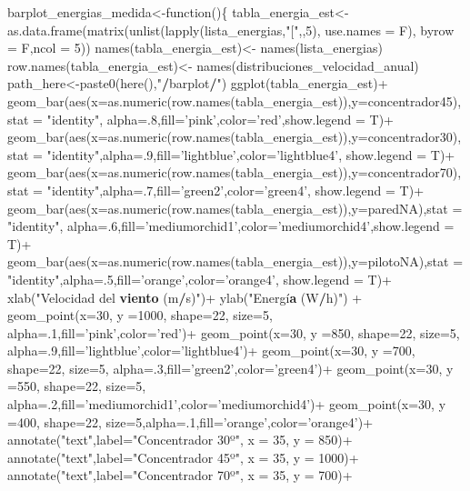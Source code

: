 \documentclass[]{article}
\newenvironment{Shaded}{\begin{snugshade}}{\end{snugshade}}
\newcommand{\KeywordTok}[1]{\textcolor[rgb]{0.13,0.29,0.53}{\textbf{#1}}}
\newcommand{\DecValTok}[1]{\textcolor[rgb]{0.00,0.00,0.81}{#1}}
\newcommand{\StringTok}[1]{\textcolor[rgb]{0.31,0.60,0.02}{#1}}
\newcommand{\OperatorTok}[1]{\textcolor[rgb]{0.81,0.36,0.00}{\textbf{#1}}}
\newcommand{\NormalTok}[1]{#1}
\begin{document}
\begin{Shaded}
\begin{Highlighting}[]
{{{{{{\StringTok{barplot_energias_medida<-function()\{}
\StringTok{  tabla_energia_est<-as.data.frame(matrix(unlist(lapply(lista_energias,"}\NormalTok{[}\StringTok{",,5), use.names = F), byrow = F,ncol = 5))}
\StringTok{  names(tabla_energia_est)<- names(lista_energias)}
\StringTok{  row.names(tabla_energia_est)<- names(distribuciones_velocidad_anual)}
\StringTok{  }
\StringTok{  path_here<-paste0(here(),"}\OperatorTok{/}\NormalTok{barplot}\OperatorTok{/}\StringTok{")}
\StringTok{  }
\StringTok{  }
\StringTok{  }
\StringTok{  }
\StringTok{  ggplot(tabla_energia_est)+}
\StringTok{    geom_bar(aes(x=as.numeric(row.names(tabla_energia_est)),y=concentrador45),stat = "}\NormalTok{identity}\StringTok{", alpha=.8,fill='pink',color='red',show.legend = T)+}
\StringTok{    geom_bar(aes(x=as.numeric(row.names(tabla_energia_est)),y=concentrador30),stat = "}\NormalTok{identity}\StringTok{",alpha=.9,fill='lightblue',color='lightblue4', show.legend = T)+}
\StringTok{    geom_bar(aes(x=as.numeric(row.names(tabla_energia_est)),y=concentrador70),stat = "}\NormalTok{identity}\StringTok{",alpha=.7,fill='green2',color='green4', show.legend = T)+}
\StringTok{    geom_bar(aes(x=as.numeric(row.names(tabla_energia_est)),y=paredNA),stat = "}\NormalTok{identity}\StringTok{", alpha=.6,fill='mediumorchid1',color='mediumorchid4',show.legend = T)+}
\StringTok{    geom_bar(aes(x=as.numeric(row.names(tabla_energia_est)),y=pilotoNA),stat = "}\NormalTok{identity}\StringTok{",alpha=.5,fill='orange',color='orange4', show.legend = T)+}
\StringTok{    xlab("}\NormalTok{Velocidad del }\KeywordTok{viento}\NormalTok{ (m}\OperatorTok{/}\NormalTok{s)}\StringTok{")+}
\StringTok{    ylab("}\NormalTok{Energí}\KeywordTok{a}\NormalTok{ (W}\OperatorTok{/}\NormalTok{h)}\StringTok{") +    }
\StringTok{    geom_point(x=30, y =1000, shape=22, size=5, alpha=.1,fill='pink',color='red')+}
\StringTok{    geom_point(x=30, y =850, shape=22, size=5, alpha=.9,fill='lightblue',color='lightblue4')+}
\StringTok{    geom_point(x=30, y =700, shape=22, size=5, alpha=.3,fill='green2',color='green4')+}
\StringTok{    geom_point(x=30, y =550, shape=22, size=5, alpha=.2,fill='mediumorchid1',color='mediumorchid4')+ }
\StringTok{    geom_point(x=30, y =400, shape=22, size=5,alpha=.1,fill='orange',color='orange4')+}
\StringTok{    annotate("}\NormalTok{text}\StringTok{",label="}\NormalTok{Concentrador }\DecValTok{30}\NormalTok{º}\StringTok{", x = 35, y = 850)+}
\StringTok{    annotate("}\NormalTok{text}\StringTok{",label="}\NormalTok{Concentrador }\DecValTok{45}\NormalTok{º}\StringTok{", x = 35, y = 1000)+}
\StringTok{    annotate("}\NormalTok{text}\StringTok{",label="}\NormalTok{Concentrador }\DecValTok{70}\NormalTok{º}\StringTok{", x = 35, y = 700)+}
}}}}}}
\end{Highlighting}
\end{Shaded}
\end{document}
